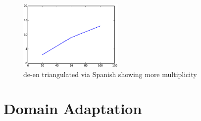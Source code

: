 	\begin{figure}
		\small
		\centering
		\includegraphics[width=0.45\textwidth]{files/Tables/de_es_en.eps}
		\caption{de-en triangulated via Spanish showing more multiplicity}
		\label{figure:de_es-en}
	\end{figure}

\section{Domain Adaptation}


